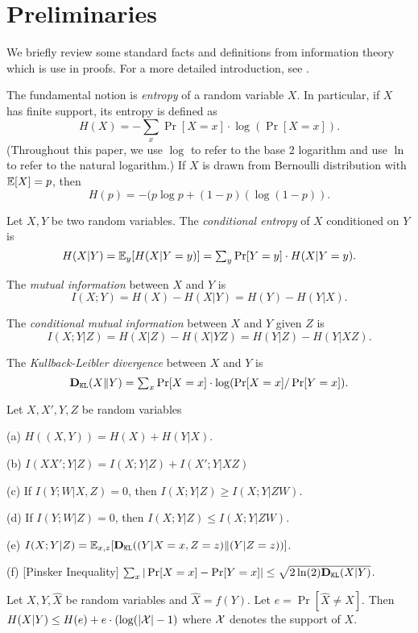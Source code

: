 \section{Preliminaries}


We briefly review some standard facts and definitions from information theory which is use in proofs. For a more detailed introduction, see \cite{CK11}. 

The fundamental notion is \emph{entropy} of a random variable $X$. In particular, if $X$ has finite support, its entropy is defined as 
\[ H(X) = \textstyle - \sum_{x} \Pr[X = x]\cdot  \log(\Pr[X = x]). \]
(Throughout this paper, we use $\log$ to refer to the base $2$ logarithm and use $\ln$ to refer to the natural logarithm.) If $X$ is drawn from Bernoulli distribution with $\mathbb{E}[X]=p$, then 
    \[ H(p) = -(p\log p + (1-p)(\log(1-p)). \]

Let $X,Y$ be two random variables. The \emph{conditional entropy} of $X$ conditioned on $Y$ is 
\[ H(X|Y) 
    = \mathbb{E}_y[H(X|Y = y)] 
    = \textstyle \sum_{y} \Pr[Y=y]\cdot H(X|Y = y). \]

The \emph{mutual information} between $X$ and $Y$ is 
\[ I(X;Y) = H(X) - H(X|Y) = H(Y) - H(Y|X).\]

The \emph{conditional mutual information} between $X$ and $Y$ given $Z$ is  
\[ I(X;Y|Z) = H(X|Z) - H(X|YZ) = H(Y|Z) - H(Y|XZ).\]


The \emph{Kullback-Leibler divergence} between $X$ and $Y$ is 
\[ \textbf{D}_{\mathtt{KL}}(X\| Y)\textstyle  = \sum_x \Pr[X = x] \cdot \log(\Pr[X = x] / \Pr[Y = x]).\]


\begin{lemma}
Let $X,X',Y,Z$ be random variables 
\begin{OneLiners}
\item[(a)] $H((X,Y)) = H(X) + H(Y|X)$.
\item[(b)] $I(X X';Y|Z) = I(X;Y|Z) + I(X';Y|XZ)$
\item[(c)] If $I(Y;W|X,Z) = 0$, then $I(X;Y|Z) \geq I(X;Y|ZW)$.
\item[(d)] If $I(Y;W|Z) = 0$, then $I(X;Y|Z) \leq I(X;Y|ZW)$.
\item[(e)] $I(X;Y|Z) = \mathbb{E}_{x,z}[\textbf{D}_{\mathtt{KL}}((Y|X = x, Z=z)\|(Y|Z=z))]$.
\item[(f)] [Pinsker Inequality] $\sum_x | \Pr[X=x] - \Pr[Y=x]| \leq \sqrt{2 \ln(2) \textbf{D}_{\mathtt{KL}}(X|Y)}$.
\end{OneLiners}
\end{lemma}

\begin{lemma}
Let $X,Y,\hat{X}$ be random variables and $\hat{X} = f(Y)$. Let $e = \Pr[\hat{X} \neq X]$. Then $H(X|Y) \leq H(e) + e \cdot (\log(|\mathcal{X}|-1)$ where $\mathcal{X}$ denotes the support of $X$.
\end{lemma} 